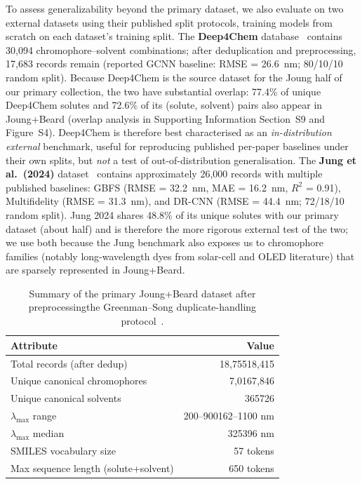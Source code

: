 \documentclass[journal=jcisd8,manuscript=article]{achemso}
\newcommand{\added}[1]{{\color{addedblue}#1}}
\newcommand{\removed}[1]{{\color{removedred}#1}}
\begin{document}
To assess generalizability beyond the primary dataset, we also evaluate on two external datasets using their published split protocols, training models from scratch on each dataset's training split.
The \textbf{Deep4Chem} database~\cite{joung2021deep} contains 30,094 chromophore--solvent combinations; after deduplication and preprocessing, 17,683 records remain (reported GCNN baseline: RMSE = 26.6~nm; 80/10/10 random split). \added{Because Deep4Chem is the source dataset for the Joung half of our primary collection, the two have substantial overlap: 77.4\% of unique Deep4Chem solutes and 72.6\% of its (solute, solvent) pairs also appear in Joung+Beard (overlap analysis in Supporting Information Section~S9 and Figure~S4). Deep4Chem is therefore best characterised as an \emph{in-distribution external} benchmark, useful for reproducing published per-paper baselines under their own splits, but \emph{not} a test of out-of-distribution generalisation.}
The \textbf{Jung et al.\ (2024)} dataset~\cite{jung2024machine} contains approximately 26,000 records with multiple published baselines: GBFS (RMSE = 32.2~nm, MAE = 16.2~nm, $R^2$ = 0.91), Multifidelity (RMSE = 31.3~nm), and DR-CNN (RMSE = 44.4~nm; 72/18/10 random split). \added{Jung 2024 shares 48.8\% of its unique solutes with our primary dataset (about half) and is therefore the more rigorous external test of the two; we use both because the Jung benchmark also exposes us to chromophore families (notably long-wavelength dyes from solar-cell and OLED literature) that are sparsely represented in Joung+Beard.}

\begin{table}[htbp]
\centering
\caption{Summary of the primary Joung+Beard dataset after \removed{preprocessing}\added{the Greenman--Song duplicate-handling protocol~\cite{greenman2022multifidelity,song2025fluortools}}.}
\label{tab:dataset_summary}
\begin{tabular}{lr}
\toprule
\textbf{Attribute} & \textbf{Value} \\
\midrule
Total records \added{(after dedup)} & \removed{18,755}\added{18,415} \\
Unique \added{canonical }chromophores & \removed{7,016}\added{7,846} \\
Unique \added{canonical }solvents & \removed{365}\added{726} \\
$\lambda_{\max}$ range & \removed{200--900}\added{162--1100} nm \\
$\lambda_{\max}$ median & \removed{325}\added{396} nm \\
SMILES vocabulary size & 57 tokens \\
Max sequence length (solute+solvent) & 650 tokens \\
\bottomrule
\end{tabular}
\end{table}
\end{document}
